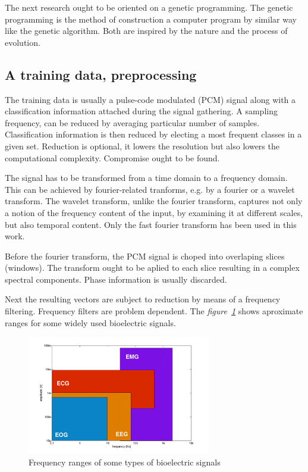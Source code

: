 \documentclass[a4paper]{IEEEtran}
\begin{document}
The next research ought to be oriented on a genetic programming. The genetic programming 
is the method of construction a computer program by similar way like the genetic
algorithm. Both are inspired by the nature and the process of evolution.


\subsection{A training data, preprocessing}
The training data is usually a pulse-code modulated (PCM) signal \cite{pcm} along with a
classification information attached during the signal gathering.
A sampling frequency, can be reduced by averaging particular number of samples. Classification
information is then reduced by electing a most frequent classes in a given set.
Reduction is optional, it lowers the resolution but also lowers the
computational complexity. Compromise ought to be found.

The signal has to be transformed
from a time domain to a frequency domain. %
This can be achieved by fourier-related tranforms, e.g. by a fourier\cite{fourier} or
a wavelet\cite{wavelet} transform.
The wavelet transform, unlike the fourier transform, captures not only a notion of the 
frequency content of the input, by examining it at different scales, but also temporal content.
Only the fast fourier transform has been used in this work.

Before the fourier transform, the PCM signal is choped into overlaping slices (windows).
The transform ought to be aplied to each slice resulting in a complex spectral components.
Phase information is usually discarded.

Next the resulting vectors are subject to reduction by means of a
frequency filtering. Frequency filters are problem dependent.
The \textit{figure~\ref{fig:filters2}} shows aproximate ranges for some widely used bioelectric signals.
\begin{figure}[h]
	\centering
	\includegraphics[width=80mm]{filters2}
	\caption{Frequency ranges of some types of bioelectric signals}
	\label{fig:filters2}
\end{figure}
\end{document}
